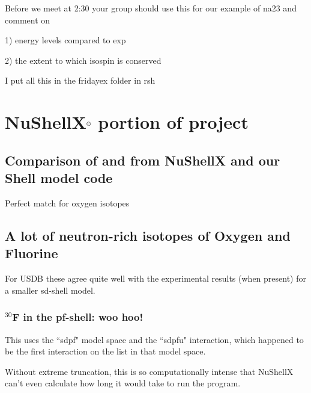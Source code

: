 \documentclass[12pt]{article}
\begin{document}
Before we meet at 2:30 your group should use this for our example of na23 and comment on

1) energy levels compared to exp

2) the extent to which isospin is conserved
    
    I put all this in the fridayex folder in rsh
    
\newpage




\section{NuShellX$^\copyright$ portion of project}

	\subsection{Comparison of  and  from NuShellX and our Shell model code}

Perfect match for oxygen isotopes

	\subsection{A lot of neutron-rich isotopes of Oxygen and Fluorine}

For USDB these agree quite well with the experimental results (when present) for a smaller sd-shell model. 



		\subsubsection{$^{30}$F in the pf-shell: woo hoo!}

This uses the ``sdpf" model space and the ``sdpfu" interaction, which happened to be the first interaction on the list in that model space. 

Without extreme truncation, this is so computationally intense that NuShellX can't even calculate how long it would take to run the program. 

\newpage
 
\end{document}
